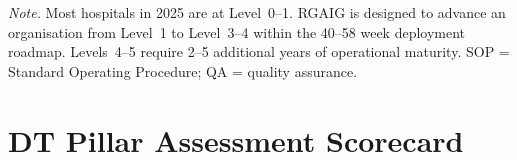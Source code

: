 \vspace{0.5em}\noindent\textit{Note.} Most hospitals in 2025 are at Level~0--1. RGAIG is designed to advance an organisation from Level~1 to Level~3--4 within the 40--58 week deployment roadmap. Levels~4--5 require 2--5 additional years of operational maturity. SOP = Standard Operating Procedure; QA = quality assurance.


\section{DT Pillar Assessment Scorecard}
\label{sec:dt_scorecard}

